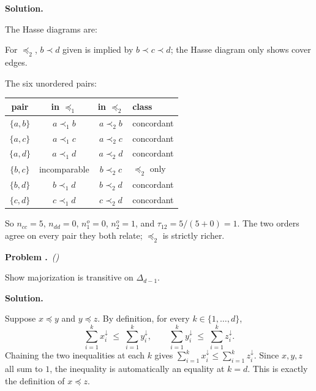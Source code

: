 \documentclass[11pt,a4paper]{article}
\newcounter{problem}
\newenvironment{problem}[1][]{%
  \refstepcounter{problem}%
  \par\medskip\noindent
  \textbf{Problem \theproblem.}\if\relax\detokenize{#1}\relax\else\ \textit{(#1)}\fi\quad\ignorespaces
}{\par\smallskip}
\newenvironment{solution}{%
  \par\noindent\textbf{Solution.}\quad\ignorespaces
}{\par\medskip}
\begin{document}
\begin{solution}
The Hasse diagrams are:

\smallskip
{}

For $\preceq_2$, $b \prec d$ given is implied by $b \prec c \prec d$;
the Hasse diagram only shows cover edges.

The six unordered pairs:
\begin{center}
\renewcommand{\arraystretch}{1.1}
\begin{tabular}{c|c|c|l}
pair & in $\preceq_1$ & in $\preceq_2$ & class \\\hline
$\{a, b\}$ & $a \prec_1 b$ & $a \prec_2 b$ & concordant \\
$\{a, c\}$ & $a \prec_1 c$ & $a \prec_2 c$ & concordant \\
$\{a, d\}$ & $a \prec_1 d$ & $a \prec_2 d$ & concordant \\
$\{b, c\}$ & incomparable  & $b \prec_2 c$ & $\preceq_2$ only \\
$\{b, d\}$ & $b \prec_1 d$ & $b \prec_2 d$ & concordant \\
$\{c, d\}$ & $c \prec_1 d$ & $c \prec_2 d$ & concordant \\
\end{tabular}
\end{center}

So $n_{cc} = 5$, $n_{dd} = 0$, $n_1^o = 0$, $n_2^o = 1$, and
$\tau_{12} = 5/(5 + 0) = 1$.  The two orders agree on every pair
they both relate; $\preceq_2$ is strictly richer.
\end{solution}

\begin{problem}
Show majorization is transitive on $\Delta_{d-1}$.
\end{problem}

\begin{solution}
Suppose $x \preceq y$ and $y \preceq z$.  By definition, for every
$k \in \{1, \ldots, d\}$,
\[
  \sum_{i=1}^{k} x_i^\downarrow \;\le\; \sum_{i=1}^{k} y_i^\downarrow,
  \qquad
  \sum_{i=1}^{k} y_i^\downarrow \;\le\; \sum_{i=1}^{k} z_i^\downarrow.
\]
Chaining the two inequalities at each $k$ gives
$\sum_{i=1}^{k} x_i^\downarrow \le \sum_{i=1}^{k} z_i^\downarrow$.
Since $x, y, z$ all sum to $1$, the inequality is automatically an
equality at $k = d$.  This is exactly the definition of $x \preceq z$.
\end{solution}
\end{document}
